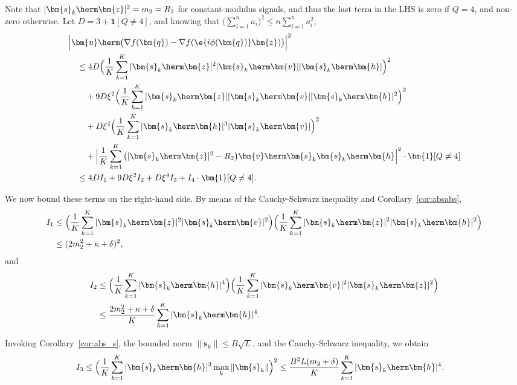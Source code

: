 Note that $|\bm{s}_k\herm\bm{z}|^2=m_2=R_2$ for constant-modulus signals, and thus the last term in the LHS is zero if $Q=4$, and non-zero otherwise. Let $D=3+\bm{1}[Q\neq4]$, and knowing that $\big(\sum_{i=1}^n a_i\big)^2\leq n\sum_{i=1}^n a_i^2$,
\begin{align}
	&\Big|\bm{u}\herm\big(\nabla f(\bm{q})-\nabla f(\e{i\phi(\bm{q})}\bm{z})\big)\Big|^2\nonumber\\
	&\quad\leq 4D\Big(\frac{1}{K}\sum_{k=1}^K|\bm{s}_k\herm\bm{z}|^2|\bm{s}_k\herm\bm{v}||\bm{s}_k\herm\bm{h}|\Big)^2  
	\nonumber\\&\qquad
	+9D\xi^2\Big(\frac{1}{K}\sum_{k=1}^K|\bm{s}_k\herm\bm{z}||\bm{s}_k\herm\bm{v}||\bm{s}_k\herm\bm{h}|^2\Big)^2
	\nonumber\\&\qquad
	+D\xi^4\Big(\frac{1}{K}\sum_{k=1}^K|\bm{s}_k\herm\bm{h}|^3|\bm{s}_k\herm\bm{v}|\Big)^2
	\nonumber\\&\qquad
	+\Big|\frac{1}{K}\sum_{k=1}^K\big(|\bm{s}_k\herm\bm{z}|^2-R_2\big)\bm{v}\herm\bm{s}_k\bm{s}_k\herm\bm{h}\Big|^2\cdot\bm{1}[Q\neq4]\nonumber\\
	&\quad\leq 4DI_1+9D\xi^2I_2+D\xi^4I_3+I_4\cdot\bm{1}[Q\neq4].\nonumber
\end{align}

We now bound these terms on the right-hand side. By means of the Cauchy-Schwarz inequality and Corollary~\ref{cor:absabs},
\begin{align}
	I_1&\leq\Big(\frac{1}{K}\sum_{k=1}^K|\bm{s}_k\herm\bm{z}|^2|\bm{s}_k\herm\bm{v}|^2\Big)\Big(\frac{1}{K}\sum_{k=1}^K|\bm{s}_k\herm\bm{z}|^2|\bm{s}_k\herm\bm{h}|^2\Big)\nonumber\\
	&\leq(2  m_2^2+\kappa+\delta)^2,\nonumber
\end{align}
and
\begin{align}
	I_2&\leq\Big(\frac{1}{K}\sum_{k=1}^K|\bm{s}_k\herm\bm{h}|^4\Big)\Big(\frac{1}{K}\sum_{k=1}^K|\bm{s}_k\herm\bm{v}|^2|\bm{s}_k\herm\bm{z}|^2\Big)\nonumber\\
	&\leq\frac{2  m_2^2+\kappa+\delta}{K}\sum_{k=1}^K|\bm{s}_k\herm\bm{h}|^4.\nonumber
\end{align}

Invoking Corollary~\ref{cor:abs_s}, the bounded norm $\|\bm{s}_k\|\leq B\sqrt{L}$, and the Cauchy-Schwarz inequality, we obtain
\begin{align}
	I_3&\leq\Big(\frac{1}{K}\sum_{k=1}^K|\bm{s}_k\herm\bm{h}|^3\max_{k}\|\bm{s}_k\|\Big)^2
	\leq\frac{B^2L(  m_2+\delta)}{K}\sum_{k=1}^K|\bm{s}_k\herm\bm{h}|^4.\nonumber
\end{align}

